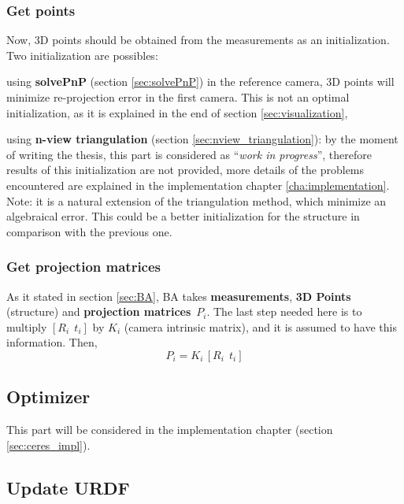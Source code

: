 \subsubsection*{Get points}

Now, 3D points should be obtained from the measurements as an initialization. Two initialization are possibles:
\begin{itemize*}
 \item using \textbf{solvePnP} (section \ref{sec:solvePnP}) in the reference camera, 3D points will minimize re-projection error in the first camera. This is not an optimal initialization, as it is explained in the end of section \ref{sec:visualization},

 \item using \textbf{n-view triangulation} (section \ref{sec:nview_triangulation}): by the moment of writing the thesis, this part is considered as ``\textit{work in progress}'', therefore results of this initialization are not provided, more details of the problems encountered are explained in the implementation chapter \ref{cha:implementation}. Note: it is a natural extension of the triangulation method, which minimize an algebraical error. This could be a better initialization for the structure in comparison with the previous one.
\end{itemize*}



\subsubsection*{Get projection matrices}

As it stated in section \ref{sec:BA}, BA takes \textbf{measurements}, \textbf{3D Points} (structure) and \textbf{projection matrices}~$P_i$. The last step needed here is to multiply $[R_i ~~ t_i]$ by $K_i$ (camera intrinsic matrix), and it is assumed to have this information. Then,
\[
 P_i = K_i \, [R_i ~~ t_i]
\]


\subsection{Optimizer}

This part will be considered in the implementation chapter (section \ref{sec:ceres_impl}).


\subsection{Update URDF}

